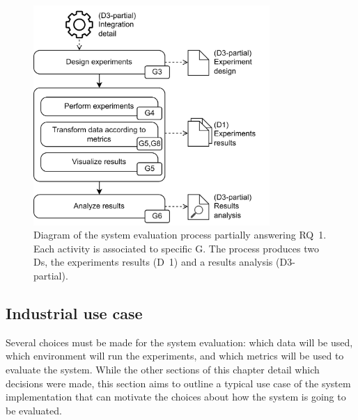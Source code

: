\begin{figure}[!ht]
    \begin{center}
    \includegraphics[width=0.8\textwidth]{figures/3-method/method_exp.png}
    \caption[System evaluation process - Hudi vs. Iceberg]{Diagram of the system evaluation process partially answering \gls{RQ}~1. Each activity is associated to specific \gls{G}. The process produces two \glspl{D}, the experiments results (\gls{D}~1) and a results analysis (\gls{D}3-partial).}
    \label{fig:method_experiments}
    \end{center}
\end{figure}




\subsection{Industrial use case}
\label{subsec:use_case}

Several choices must be made for the system evaluation: which data will be used, which environment will run the experiments, and which metrics will be used to evaluate the system. While the other sections of this chapter detail which decisions were made, this section aims to outline a typical use case of the system implementation that can motivate the choices about how the system is going to be evaluated.


